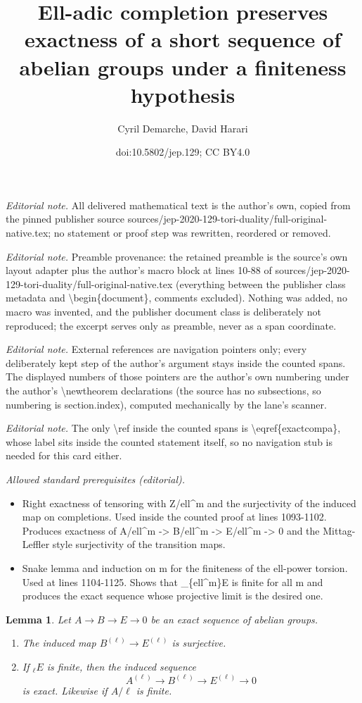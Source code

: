 \documentclass[10pt,a4paper]{amsart}
\title{Ell-adic completion preserves exactness of a short sequence of abelian groups under a finiteness hypothesis}
\author{Cyril Demarche, David Harari}
\date{doi:10.5802/jep.129; CC BY4.0}
\newenvironment{enumeratea}
{\bgroup\def\theenumi{\alph{enumi}}\begin{enumerate}}
{\end{enumerate}\egroup}
\theoremstyle{plain}
\newtheorem{lem}[theo]{Lemma}
\theoremstyle{definition}
\begin{document}
\maketitle
\noindent\textit{Editorial note.} All delivered mathematical text is the author's own, copied from the pinned publisher source sources/jep-2020-129-tori-duality/full-original-native.tex; no statement or proof step was rewritten, reordered or removed.\par\medskip
\noindent\textit{Editorial note.} Preamble provenance: the retained preamble is the source's own layout adapter plus the author's macro block at lines 10-88 of sources/jep-2020-129-tori-duality/full-original-native.tex (everything between the publisher class metadata and \textbackslash{}begin\{document\}, comments excluded). Nothing was added, no macro was invented, and the publisher document class is deliberately not reproduced; the excerpt serves only as preamble, never as a span coordinate.\par\medskip
\noindent\textit{Editorial note.} External references are navigation pointers only; every deliberately kept step of the author's argument stays inside the counted spans. The displayed numbers of those pointers are the author's own numbering under the author's \textbackslash{}newtheorem declarations (the source has no subsections, so numbering is section.index), computed mechanically by the lane's scanner.\par\medskip
\noindent\textit{Editorial note.} The only \textbackslash{}ref inside the counted spans is \textbackslash{}eqref\{exactcompa\}, whose label sits inside the counted statement itself, so no navigation stub is needed for this card either.\par\medskip
\noindent\textit{Allowed standard prerequisites (editorial).}\begin{itemize}
\item Right exactness of tensoring with Z/ell\textasciicircum{}m and the surjectivity of the induced map on completions. Used inside the counted proof at lines 1093-1102. Produces exactness of A/ell\textasciicircum{}m -> B/ell\textasciicircum{}m -> E/ell\textasciicircum{}m -> 0 and the Mittag-Leffler style surjectivity of the transition maps.
\item Snake lemma and induction on m for the finiteness of the ell-power torsion. Used at lines 1104-1125. Shows that \_\{ell\textasciicircum{}m\}E is finite for all m and produces the exact sequence whose projective limit is the desired one.
\end{itemize}\medskip
\begin{lem} \label{exactcomp}
Let $A \to B \to E \to 0$ be an exact sequence of abelian groups.
\begin{enumeratea}
\item\label{exactcompa}
The induced map $B^{(\ell)} \to E^{(\ell)}$ is surjective.

\item\label{exactcompb}
If $_{\ell} E$ is finite, then the induced sequence
\[
A^{(\ell)} \to B^{(\ell)} \to E^{(\ell)} \to 0
\]
is exact. Likewise if $A/\ell$ is finite.
\end{enumeratea}
\end{lem}
\end{document}
